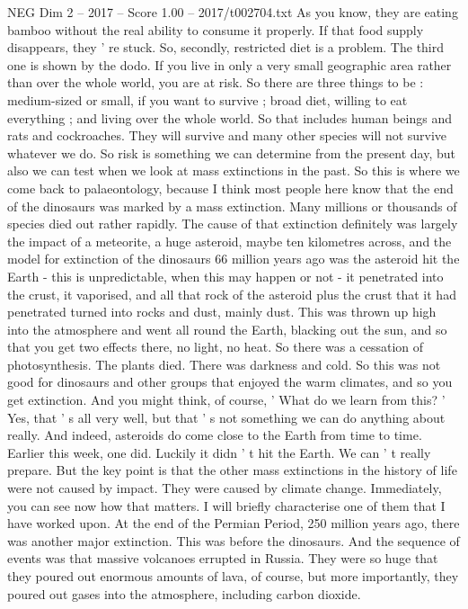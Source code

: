 \begin{textsample}{NEG Dim 2 – 2017 – Score 1.00 – 2017/t002704.txt}
As you know, they are eating bamboo without the real ability to consume it properly.
If that food supply disappears, they ' re stuck.
So, secondly, restricted diet is a problem.
The third one is shown by the dodo.
If you live in only a very small geographic area rather than over the whole world, you are at risk.
So there are three things to be : medium-sized or small, if you want to survive ; broad diet, willing to eat everything ; and living over the whole world.
So that includes human beings and rats and cockroaches.
They will survive and many other species will not survive whatever we do.
So risk is something we can determine from the present day, but also we can test when we look at mass extinctions in the past.
So this is where we come back to palaeontology, because I think most people here know that the end of the dinosaurs was marked by a mass extinction.
Many millions or thousands of species died out rather rapidly.
The cause of that extinction definitely was largely the impact of a meteorite, a huge asteroid, maybe ten kilometres across, and the model for extinction of the dinosaurs 66 million years ago was the asteroid hit the Earth - this is unpredictable, when this may happen or not - it penetrated into the crust, it vaporised, and all that rock of the asteroid plus the crust that it had penetrated turned into rocks and dust, mainly dust.
This was thrown up high into the atmosphere and went all round the Earth, blacking out the sun, and so that you get two effects there, no light, no heat.
So there was a cessation of photosynthesis.
The plants died.
There was darkness and cold.
So this was not good for dinosaurs and other groups that enjoyed the warm climates, and so you get extinction.
And you might think, of course, ' What do we learn from this? ' Yes, that ' s all very well, but that ' s not something we can do anything about really.
And indeed, asteroids do come close to the Earth from time to time.
Earlier this week, one did.
Luckily it didn ' t hit the Earth.
We can ' t really prepare.
But the key point is that the other mass extinctions in the history of life were not caused by impact.
They were caused by climate change.
Immediately, you can see now how that matters.
I will briefly characterise one of them that I have worked upon.
At the end of the Permian Period, 250 million years ago, there was another major extinction.
This was before the dinosaurs.
And the sequence of events was that massive volcanoes errupted in Russia.
They were so huge that they poured out enormous amounts of lava, of course, but more importantly, they poured out gases into the atmosphere, including carbon dioxide.

\end{textsample}
